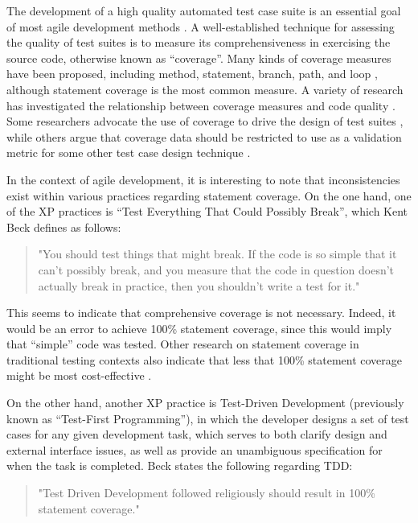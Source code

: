 \documentclass[10pt,twocolumn]{article}
\begin{document}
\label{sec:XC}

The development of a high quality automated test case suite is an essential
goal of most agile development methods \cite{Marick:2001}.  A
well-established technique for assessing the quality of test suites is to
measure its comprehensiveness in exercising the source code, otherwise
known as ``coverage''.  Many kinds of coverage measures have been proposed,
including method, statement, branch, path, and loop \cite{DeMillo:1987},
although statement coverage is the most common measure. A variety of research has
investigated the relationship between coverage measures and code quality
\cite{Bishop:2002,Morgan:1996,Saileshwar:1996}. Some researchers advocate
the use of coverage to drive the design of test suites \cite{Horgan:1994},
while others argue that coverage data should be restricted to use as a
validation metric for some other test case design technique
\cite{Marick:1997}.

In the context of agile development, it is interesting to note that
inconsistencies exist within various practices regarding
statement coverage. On the one hand, one of the XP practices is ``Test Everything That Could
Possibly Break'', which Kent Beck defines as follows:

\begin{quotation}
"You should test things that might break. If the code is so simple that it
can't possibly break, and you measure that the code in question doesn't
actually break in practice, then you shouldn't write a test for it." \cite{Beck:2001}
\end{quotation}

This seems to indicate that comprehensive coverage is not necessary. Indeed,
it would  be an error to achieve 100\% statement coverage, since
this would imply that ``simple'' code was tested. Other research on
statement coverage in traditional testing contexts also indicate that less
that 100\% statement coverage might be most cost-effective \cite{Piwowarski:1993}.

On the other hand, another XP practice is Test-Driven Development
(previously known as ``Test-First Programming''), in which the developer
designs a set of test cases for any given development task, which serves to
both clarify design and external interface issues, as well as provide an
unambiguous specification for when the task is completed.  Beck states the
following regarding TDD:

\begin{quotation}
"Test Driven Development followed religiously should result in 100\% statement coverage." \cite{Beck:2003}
\end{quotation}
\end{document}
